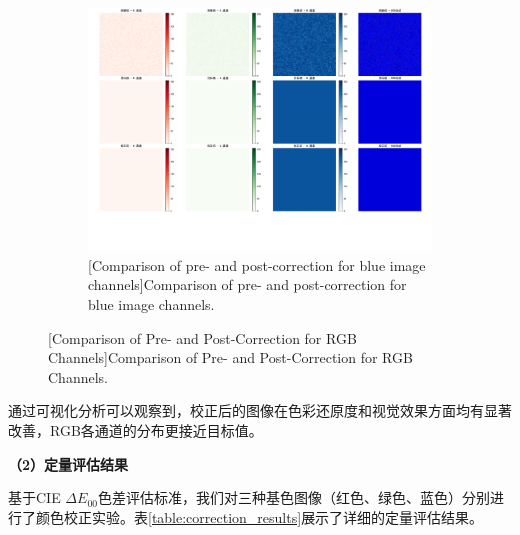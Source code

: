\begin{figure}[H]
\begin{subfigure}[b]{0.6\textwidth}
    \label{figure4:g_compare}
  \end{subfigure}
  \hfill
  \begin{subfigure}[b]{0.6\textwidth}
    \includegraphics[width=\textwidth]{figures/model_solution/p3/B.pdf}
    [Comparison of pre- and post-correction for blue image channels]{Comparison of pre- and post-correction for blue image channels.}
    \label{figure4:b_compare}
  \end{subfigure}

  [Comparison of Pre- and Post-Correction for RGB Channels]{Comparison of Pre- and Post-Correction for RGB Channels.}
  \label{figure4:rgb_compare}
\end{figure}

通过可视化分析可以观察到，校正后的图像在色彩还原度和视觉效果方面均有显著改善，RGB各通道的分布更接近目标值。

\noindent\textbf{（2）定量评估结果}

基于CIE $\Delta E_{00}$色差评估标准，我们对三种基色图像（红色、绿色、蓝色）分别进行了颜色校正实验。表\ref{table:correction_results}展示了详细的定量评估结果。

